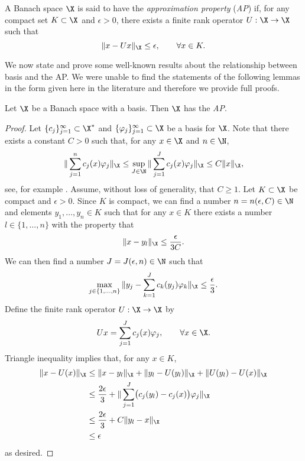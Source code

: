\begin{definition}
\label{def:ap}
A Banach space \(\X\) is said to have the \textit{approximation property} (\emph{AP}) if, for any compact set \(K \subset \X\)
and \(\epsilon > 0\), there exists a finite rank operator \(U : \X \to \X\) such that
\[\|x - Ux\|_{\X} \leq \epsilon, \qquad  \forall x \in K.\]
\end{definition}

We now state and prove some well-known results about the relationship between basis and the AP. We were unable to find the statements of the following lemmas in the form given here in the literature and therefore we provide full proofs.

\begin{lemma}
\label{lemma:schauder_ap}
Let \(\X\) be a Banach space with a basis. Then \(\X\) has the \emph{AP}.
\end{lemma}
\begin{proof}
Let \(\{c_j\}_{j=1}^\infty \subset \X^*\) and \(\{\varphi_j\}_{j=1}^\infty \subset \X\) be a basis for \(\X\).
Note that there exists a constant \(C > 0\) such that, for any \(x \in \X\) and \(n \in \N\),
\[\|\sum_{j=1}^n c_j(x) \varphi_j\|_\X \leq \sup_{J \in \N} \|\sum_{j=1}^J c_j(x) \varphi_j\|_\X \leq C \|x\|_\X,\]
see, for example \cite[Remark 1.1.6]{albiac2006topics}. Assume, without loss of generality, that \(C \geq 1\).
Let \(K \subset \X\) be compact and \(\epsilon > 0\). Since \(K\) is compact, we can find 
a number \(n =  n(\epsilon, C) \in \N\) and elements \(y_1,\dots,y_n \in K\) such that
for any \(x \in K\) there exists a number \(l \in \{1,\dots,n\}\) with the property that
\[\|x - y_l\|_\X \leq \frac{\epsilon}{3C}.\] 
We can then find a number \(J = J(\epsilon,n) \in \N\) such that
\[\max_{j \in \{1,\dots,n\}}\|y_j - \sum_{k=1}^J c_k(y_j) \varphi_k \|_\X \leq \frac{\epsilon}{3}.\] 
Define the finite rank operator \(U : \X \to \X\) by
\[Ux = \sum_{j=1}^J c_j(x) \varphi_j, \qquad \forall x \in \X.\]
Triangle inequality implies that, for any \(x \in K\),
\begin{align*}
\|x - U(x)\|_\X &\leq \|x - y_l\|_\X + \|y_l - U(y_l)\|_\X + \|U(y_l) - U(x)\|_\X \\
&\leq \frac{2 \epsilon}{3} + \|\sum_{j=1}^J \bigl (c_j(y_l) - c_j(x) \bigl ) \varphi_j \|_\X \\
&\leq \frac{2 \epsilon}{3} + C\|y_l - x\|_\X \\
&\leq \epsilon
\end{align*}
as desired.
\end{proof}

